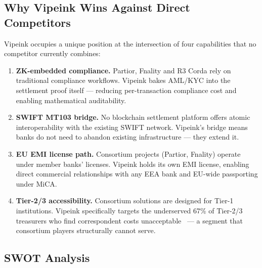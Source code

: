 \documentclass[11pt,a4paper]{article}
\begin{document}
\subsection*{Why Vipeink Wins Against Direct Competitors}

Vipeink occupies a unique position at the intersection of four capabilities that no competitor currently combines:

\begin{enumerate}[leftmargin=2em, itemsep=4pt, parsep=0pt]
\item \textbf{ZK-embedded compliance.} Partior, Fnality and R3 Corda rely on traditional compliance workflows. Vipeink bakes AML/KYC into the settlement proof itself --- reducing per-transaction compliance cost and enabling mathematical auditability.
\item \textbf{SWIFT MT103 bridge.} No blockchain settlement platform offers atomic interoperability with the existing SWIFT network. Vipeink's bridge means banks do not need to abandon existing infrastructure --- they extend it.
\item \textbf{EU EMI license path.} Consortium projects (Partior, Fnality) operate under member banks' licenses. Vipeink holds its own EMI license, enabling direct commercial relationships with any EEA bank and EU-wide passporting under MiCA.
\item \textbf{Tier-2/3 accessibility.} Consortium solutions are designed for Tier-1 institutions. Vipeink specifically targets the underserved 67\% of Tier-2/3 treasurers who find correspondent costs unacceptable~\cite{mckinsey_2024} --- a segment that consortium players structurally cannot serve.
\end{enumerate}


\subsection*{SWOT Analysis}
\end{document}

